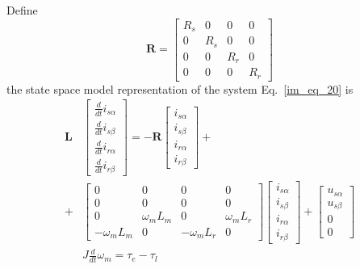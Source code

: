 \documentclass[11pt,a4paper,oneside]{book}
\numberwithin{equation}{section}
\theoremstyle{it}
\theoremstyle{definition}
\begin{document}
Define 
\begin{equation}\label{im_eq_23}
	\mathbf{R}=
	\left[\begin{matrix}
		R_s & 0 & 0 & 0 \\[6pt]
		0 & R_s & 0 & 0 \\[6pt]
		0 & 0 & R_r & 0 \\[6pt]
		0 & 0 & 0 & R_r 
	\end{matrix}\right]
\end{equation}
the state space model representation of the system Eq.~\eqref{im_eq_20} is
\begin{equation}\label{im_eq_24}
	\begin{aligned}
		\mathbf{L} &
		\begin{bmatrix}
			\frac{d}{dt} i_{s\alpha} \\[6pt]
			\frac{d}{dt} i_{s\beta} \\[6pt]
			\frac{d}{dt} i_{r\alpha} \\[6pt]
			\frac{d}{dt} i_{r\beta}
		\end{bmatrix} = -\mathbf{R}
		\begin{bmatrix}
			i_{s\alpha} \\[6pt]
			i_{s\beta} \\[6pt]
			i_{r\alpha} \\[6pt]
			i_{r\beta} 
		\end{bmatrix} + \\[6pt]
		+ &
		\begin{bmatrix}
			0 & 0 & 0 & 0 \\[6pt]
			0 & 0 & 0 & 0 \\[6pt]
			0 & \omega_mL_m & 0 & \omega_mL_r \\[8pt]
			-\omega_mL_m & 0 & -\omega_mL_r & 0
		\end{bmatrix}
		\begin{bmatrix}
			i_{s\alpha} \\[6pt]
			i_{s\beta} \\[6pt]
			i_{r\alpha} \\[6pt]
			i_{r\beta} 
		\end{bmatrix} + 
		\begin{bmatrix}
			u_{s\alpha} \\[6pt]
			u_{s\beta} \\[6pt]
			0 \\[6pt]
			0
		\end{bmatrix} \\[8pt]
		&
		J\frac{d}{dt}{\omega}_m = \tau_e-\tau_l
	\end{aligned}
\end{equation}
\end{document}
